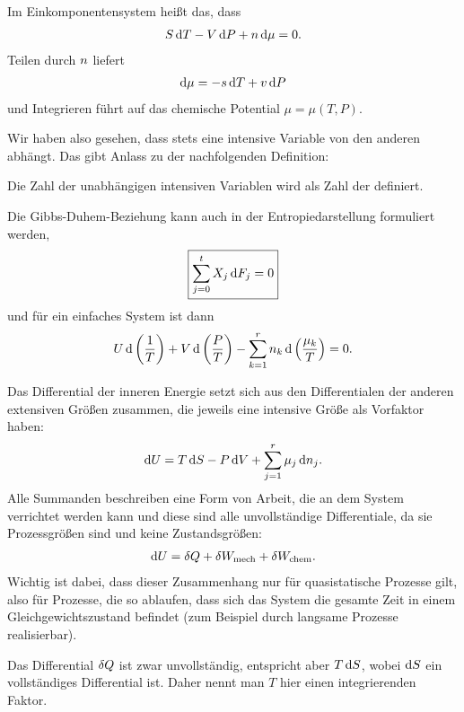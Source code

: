 Im Einkomponentensystem heißt das, dass
\begin{align*}
    S\mathop{}\!\mathrm{d} T - V\mathop{}\!\mathrm{d} P + n \mathop{}\!\mathrm{d} \mu = 0.
\end{align*}
Teilen durch $n$ liefert
\begin{align*}
    \mathop{}\!\mathrm{d} \mu = -s \mathop{}\!\mathrm{d} T + v\mathop{}\!\mathrm{d} P
\end{align*}
und Integrieren führt auf das chemische Potential $\mu=\mu(T,P)$.

Wir haben also gesehen, dass stets eine intensive Variable von den anderen abhängt. Das gibt Anlass zu der nachfolgenden Definition:
\begin{formal}
    Die Zahl der unabhängigen intensiven Variablen wird als Zahl der  definiert.
\end{formal}

Die Gibbs-Duhem-Beziehung kann auch in der Entropiedarstellung formuliert werden,
\begin{align*}
    \boxed{\sum_{j=0}^t X_j \mathop{}\!\mathrm{d} F_j = 0}
\end{align*}
und für ein einfaches System ist dann
\begin{align*}
    U\mathop{}\!\mathrm{d}\left(\frac{1}{T}\right) + V\mathop{}\!\mathrm{d}\left(\frac{P}{T}\right)-\sum_{k=1}^r n_k\mathop{}\!\mathrm{d}\left(\frac{\mu_k}{T}\right)=0.
\end{align*}


\begin{summary}
    Das Differential der inneren Energie setzt sich aus den Differentialen der anderen extensiven Größen zusammen, die jeweils eine intensive Größe als Vorfaktor haben:
    \begin{align*}
        \mathop{}\!\mathrm{d} U = T \mathop{}\!\mathrm{d} S - P \mathop{}\!\mathrm{d} V + \sum_{j=1}^r \mu_j \mathop{}\!\mathrm{d} n_j.
    \end{align*}
    Alle Summanden beschreiben eine Form von Arbeit, die an dem System verrichtet werden kann und diese sind alle unvollständige Differentiale, da sie Prozessgrößen sind und keine Zustandsgrößen:
    \begin{align*}
        \mathop{}\!\mathrm{d} U = \mathop{}\!\delta Q + \mathop{}\!\delta W_\mathrm{mech} + \mathop{}\!\delta W_\mathrm{chem}.
    \end{align*}
    Wichtig ist dabei, dass dieser Zusammenhang nur für quasistatische Prozesse gilt, also für Prozesse, die so ablaufen, dass sich das System die gesamte Zeit in einem Gleichgewichtszustand befindet (zum Beispiel durch langsame Prozesse realisierbar). 

    Das Differential $\mathop{}\!\delta Q$ ist zwar unvollständig, entspricht aber $T\mathop{}\!\mathrm{d} S$, wobei $\mathop{}\!\mathrm{d} S$ ein vollständiges Differential ist. Daher nennt man $T$ hier einen integrierenden Faktor.

\end{summary}